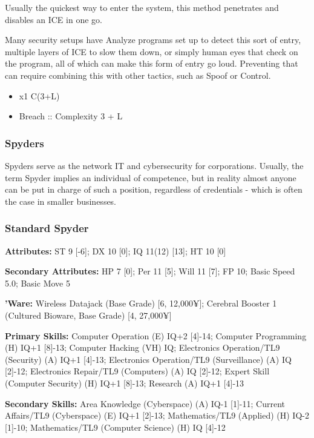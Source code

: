 \begin{multicols}{2}
	Usually the quickest way to enter the system, this method penetrates and disables an ICE in one go. 
	
	Many security setups have Analyze programs set up to detect this sort of entry, multiple layers of ICE to slow them down, or simply human eyes that check on the program, all of which can make this form of entry go loud. Preventing that can require combining this with other tactics, such as Spoof or Control.
	
	\begin{itemize}
		\itemsep 0pt
		\item x1 C(3+L)
		\item Breach :: Complexity 3 + L
	\end{itemize}
	
	
	\subsubsection{Spyders}
	
	Spyders serve as the network IT and cybersecurity for corporations. Usually, the term Spyder implies an  individual of competence, but in reality almost anyone can be put in charge of such a position, regardless of credentials - which is often the case in smaller businesses.
	
	\subsubsection*{Standard Spyder}
	
	\textbf{Attributes:}
	ST 9 [-6]; DX 10 [0]; IQ 11(12) [13]; HT 10 [0]
	
	\textbf{Secondary Attributes:} HP 7 [0]; Per 11 [5]; Will 11 [7]; FP 10; Basic Speed 5.0; Basic Move 5
	
	\textbf{'Ware:} 
	Wireless Datajack (Base Grade) [6, 12,000¥]; Cerebral Booster 1 (Cultured Bioware, Base Grade) [4, 27,000¥]
	
	\textbf{Primary Skills:} 
	Computer Operation (E) IQ+2 [4]-14; Computer Programming (H) IQ+1 [8]-13; Computer Hacking (VH) IQ; Electronics Operation/TL9 (Security) (A) IQ+1 [4]-13; Electronics Operation/TL9 (Surveillance) (A) IQ [2]-12; Electronics Repair/TL9 (Computers) (A) IQ [2]-12; Expert Skill (Computer Security) (H) IQ+1 [8]-13; Research (A) IQ+1 [4]-13
	
	\textbf{Secondary Skills:} 
	Area Knowledge (Cyberspace) (A) IQ-1 [1]-11; Current Affairs/TL9 (Cyberspace) (E) IQ+1 [2]-13; Mathematics/TL9 (Applied) (H) IQ-2 [1]-10; Mathematics/TL9 (Computer Science) (H) IQ [4]-12
	

\end{multicols}
